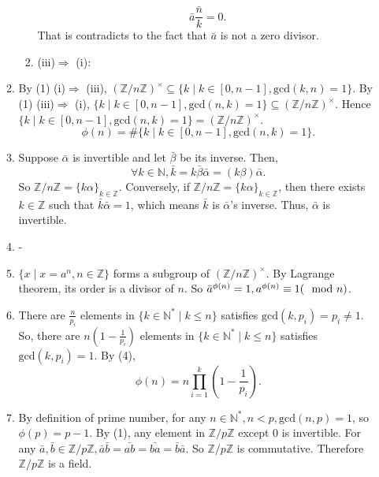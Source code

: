\documentclass[12pt]{article}
\newcommand{\NN}{\mathbb{N}}
\newcommand{\ZZ}{\mathbb{Z}}
\begin{document}
\begin{enumerate}
\begin{enumerate}
\begin{enumerate}
                            $$\bar{a}\bar{\frac{n}{k}}=0.$$
                            That is contradicts to the fact that $\bar{a}$ is not a zero divisor.
                        \item (iii)$\Rightarrow$ (i): 
                    \end{enumerate}
                    \item By (1) (i)$\Rightarrow$ (iii), $(\ZZ/n\ZZ)^\times\subseteq\{k\mid k\in [0,n-1], \mathrm{gcd}(k,n)=1\}$.
                        \newline
                        By (1) (iii)$\Rightarrow$ (i), $\{k\mid k\in [0,n-1],\mathrm{gcd}(n,k)=1\}\subseteq (\ZZ/n\ZZ)^\times$.
                        \newline Hence $\{k\mid k\in [0,n-1],\mathrm{gcd}(n,k)=1\}=(\ZZ/n\ZZ)^\times$. 
                        $$\phi(n)=\#\{k\mid k\in [0,n-1],\mathrm{gcd}(n,k)=1\}.$$
                    \item  Suppose $\bar{\alpha}$ is invertible and let $\bar{\beta}$ be its inverse. Then, 
                        $$\forall k\in \NN, \bar{k}=k\bar{\beta}\bar{\alpha}=(k\beta)\bar{\alpha}.$$
                        So $\ZZ/n\ZZ=\{k\alpha\}_{k\in\ZZ}$.
                        \newline
                        Conversely, if $\ZZ/n\ZZ=\{k\alpha\}_{k\in\ZZ}$, then there exists $k\in\ZZ$ such that $\bar{k}\bar{\alpha}=1$, which means $\bar{k}$ is $\bar{\alpha}$'s inverse. Thus, $\bar{\alpha}$ is invertible.
                    \item -
                    \item $\{x\mid x=a^n,n\in\ZZ\}$ forms a subgroup of $(\ZZ/n\ZZ)^\times$. By Lagrange theorem, its order is a divisor of $n$. So $\bar{a}^{\phi(n)}=1, a^{\phi(n)}\equiv 1 (\mathrm{\mod} n )$.
                    \item There are $\frac{n}{p_i}$ elements in $\{k\in\NN^{*}\mid k\le n\}$ satisfies $\mathrm{gcd}(k,p_i)=p_i\not=1$. So, there are $n(1-\frac{1}{p_i})$ elements in $\{k\in\NN^{*}\mid k\le n\}$ satisfies $\mathrm{gcd}(k,p_i)=1$. By (4),
                        $$\phi(n)=n\prod_{i=1}^{k}(1-\frac{1}{p_i}).$$
                    \item By definition of prime number, for any $n\in \NN^{*}, n<p, \mathrm{gcd}(n,p)=1$, so $\phi(p)=p-1.$ By (1), any element in $\ZZ/p\ZZ$ except $0$ is invertible. For any $\bar{a},\bar{b}\in \ZZ/p\ZZ, \bar{a}\bar{b}=\bar{ab}=\bar{ba}=\bar{b}\bar{a}.$ So $\ZZ/p\ZZ$ is commutative. Therefore $\ZZ/p\ZZ$ is a field. 
            \end{enumerate}
\end{enumerate}
\end{document}
